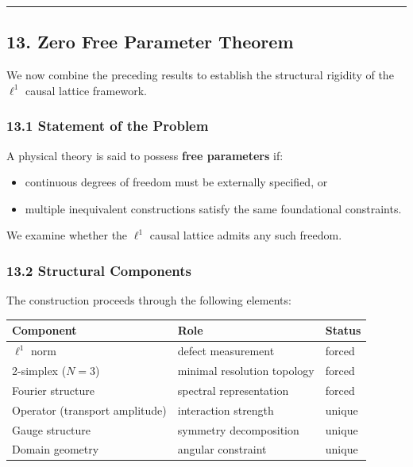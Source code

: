\documentclass[
]{article}
\providecommand{\tightlist}{%
  \setlength{\itemsep}{0pt}\setlength{\parskip}{0pt}}
\begin{document}
\begin{center}\rule{0.5\linewidth}{0.5pt}\end{center}

\hypertarget{zero-free-parameter-theorem}{%
\subsection{13. Zero Free Parameter
Theorem}\label{zero-free-parameter-theorem}}

We now combine the preceding results to establish the structural
rigidity of the \(\ell^1\) causal lattice framework.

\hypertarget{statement-of-the-problem}{%
\subsubsection{13.1 Statement of the
Problem}\label{statement-of-the-problem}}

A physical theory is said to possess \textbf{free parameters} if:

\begin{itemize}
\tightlist
\item
  continuous degrees of freedom must be externally specified, or
\item
  multiple inequivalent constructions satisfy the same foundational
  constraints.
\end{itemize}

We examine whether the \(\ell^1\) causal lattice admits any such
freedom.

\hypertarget{structural-components}{%
\subsubsection{13.2 Structural Components}\label{structural-components}}

The construction proceeds through the following elements:

\begin{longtable}[]{@{}lll@{}}
\toprule
Component & Role & Status\tabularnewline
\midrule
\endhead
\(\ell^1\) norm & defect measurement & forced\tabularnewline
2-simplex (\(N = 3\)) & minimal resolution topology &
forced\tabularnewline
Fourier structure & spectral representation & forced\tabularnewline
Operator (transport amplitude) & interaction strength &
unique\tabularnewline
Gauge structure & symmetry decomposition & unique\tabularnewline
Domain geometry & angular constraint & unique\tabularnewline
\bottomrule
\end{longtable}
\end{document}
